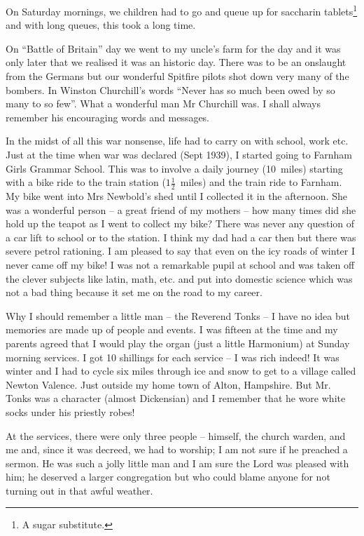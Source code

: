 On Saturday mornings, we children had to go and queue up for saccharin
tablets\footnote{A sugar substitute.} and with long queues, this took
a long time.

On ``Battle of Britain'' day we went to my uncle's farm for the day
and it was only later that we realised it was an historic day. There
was to be an onslaught from the Germans but our wonderful Spitfire
pilots shot down very many of the bombers. In Winston Churchill's
words ``Never has so much been owed by so many to so few''. What a
wonderful man Mr Churchill was. I shall always remember his
encouraging words and messages.

In the midst of all this war nonsense, life had to carry on with
school, work etc. Just at the time when war was declared (Sept 1939),
I started going to Farnham Girls Grammar School. This was to involve a
daily journey (10~miles) starting with a bike ride to the train
station ($1\frac{1}{2}$~miles) and the train ride to Farnham. My bike
went into Mrs Newbold’s shed until I collected it in the
afternoon. She was a wonderful person -- a great friend of my mothers
-- how many times did she hold up the teapot as I went to collect my
bike? There was never any question of a car lift to school or to the
station. I think my dad had a car then but there was severe petrol
rationing. I am pleased to say that even on the icy roads of winter I
never came off my bike! I was not a remarkable pupil at school and was
taken off the clever subjects like latin, math, etc. and put into
domestic science which was not a bad thing because it set me on the
road to my career.

Why I should remember a little man -- the Reverend Tonks -- I have no
idea but memories are made up of people and events. I was fifteen at
the time and my parents agreed that I would play the organ (just a
little Harmonium) at Sunday morning services. I got 10 shillings for
each service -- I was rich indeed! It was winter and I had to cycle
six miles through ice and snow to get to a village called Newton
Valence. Just outside my home town of Alton, Hampshire. But Mr. Tonks
was a character (almost Dickensian) and I remember that he wore white
socks under his priestly robes!

At the services, there were only three people -- himself, the church
warden, and me and, since it was decreed, we had to worship; I am not
sure if he preached a sermon. He was such a jolly little man and I am
sure the Lord was pleased with him; he deserved a larger congregation
but who could blame anyone for not turning out in that awful weather.


